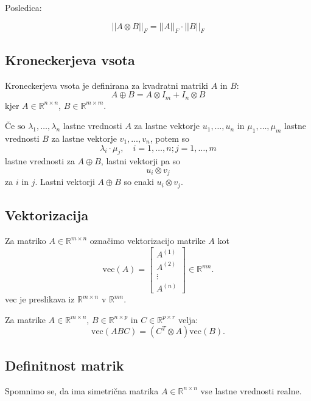 \documentclass{article}
\begin{document}
\begin{multicols}{2}
	Posledica:

	\[
		||A \otimes B||_F = ||A||_F \cdot ||B||_F
	\]

	\subsection{Kroneckerjeva vsota}

	Kroneckerjeva vsota je definirana za kvadratni matriki \( A \) in \( B \):
	\[ A \oplus B = A \otimes I_m + I_n \otimes B \]
	kjer \( A \in \mathbb{R}^{n \times n} \), \( B \in \mathbb{R}^{m \times m} \).

	\(\text{Če so } \lambda_1, \ldots, \lambda_n \) lastne vrednosti \( A \) za lastne vektorje \( u_1, \ldots, u_n \) in \( \mu_1, \ldots, \mu_m \) lastne vrednosti \( B \) za lastne vektorje \( v_1, \ldots, v_n \), potem so
	\[ \lambda_i \cdot \mu_j, \quad i = 1, \ldots, n; j = 1, \ldots, m \]
	lastne vrednosti za \( A \oplus B \), lastni vektorji pa so
	\[ u_i \otimes v_j \]
	za \( i \) in \( j \). Lastni vektorji \( A \oplus B \) so enaki \( u_i \otimes v_j \).


	\subsection{Vektorizacija}

	Za matriko \( A \in \mathbb{R}^{m \times n} \) označimo vektorizacijo matrike \( A \) kot
	\[
		\text{vec}(A) = \begin{bmatrix}
			A^{(1)} \\
			A^{(2)} \\
			\vdots  \\
			A^{(n)}
		\end{bmatrix} \in \mathbb{R}^{mn}.
	\]
	vec je preslikava iz \( \mathbb{R}^{m \times n} \) v \( \mathbb{R}^{mn} \).

	Za matrike \( A \in \mathbb{R}^{m \times n} \), \( B \in \mathbb{R}^{n \times p} \) in \( C \in \mathbb{R}^{p \times r} \) velja:
	\[
		\text{vec}(ABC) = (C^T \otimes A)\text{vec}(B).
	\]

	\subsection{Definitnost matrik}

	Spomnimo se, da ima simetrična matrika \( A \in \mathbb{R}^{n \times n} \) vse lastne vrednosti realne.


\end{multicols}
\end{document}
